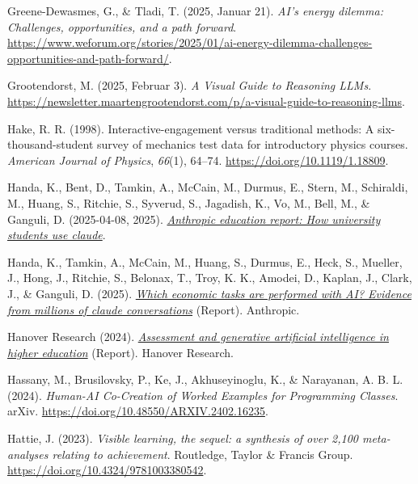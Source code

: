 \documentclass[
  ngerman,
  letterpaper,
  DIV=11]{scrreprt}
\newlength{\cslhangindent}
\newenvironment{CSLReferences}[2] %
 {\begin{list}{}{%
  \setlength{\itemindent}{0pt}
  \setlength{\leftmargin}{0pt}
  \setlength{\parsep}{0pt}
  \ifodd #1
   \setlength{\leftmargin}{\cslhangindent}
   \setlength{\itemindent}{-1\cslhangindent}
  \fi
  \setlength{\itemsep}{#2\baselineskip}}}
 {\end{list}}
\begin{document}
\begin{CSLReferences}{1}{0}
Greene-Dewasmes, G., \& Tladi, T. (2025, Januar 21). \emph{AI's energy
dilemma: Challenges, opportunities, and a path forward}.
\url{https://www.weforum.org/stories/2025/01/ai-energy-dilemma-challenges-opportunities-and-path-forward/}.

Grootendorst, M. (2025, Februar 3). \emph{A Visual Guide to Reasoning
LLMs}.
\url{https://newsletter.maartengrootendorst.com/p/a-visual-guide-to-reasoning-llms}.

Hake, R. R. (1998). Interactive-engagement versus traditional methods: A
six-thousand-student survey of mechanics test data for introductory
physics courses. \emph{American Journal of Physics}, \emph{66}(1),
64--74. \url{https://doi.org/10.1119/1.18809}.

Handa, K., Bent, D., Tamkin, A., McCain, M., Durmus, E., Stern, M.,
Schiraldi, M., Huang, S., Ritchie, S., Syverud, S., Jagadish, K., Vo,
M., Bell, M., \& Ganguli, D. (2025-04-08, 2025).
\emph{\href{https://www.anthropic.com/news/anthropic-education-report-how-university-students-use-claude}{Anthropic
education report: How university students use claude}}.

Handa, K., Tamkin, A., McCain, M., Huang, S., Durmus, E., Heck, S.,
Mueller, J., Hong, J., Ritchie, S., Belonax, T., Troy, K. K., Amodei,
D., Kaplan, J., Clark, J., \& Ganguli, D. (2025).
\emph{\href{https://assets.anthropic.com/m/2e23255f1e84ca97/original/Economic_Tasks_AI_Paper.pdf}{Which
economic tasks are performed with AI? Evidence from millions of claude
conversations}} (Report). Anthropic.

Hanover Research (2024).
\emph{\href{https://cms.ahs.uic.edu/inside-ahs/wp-content/uploads/sites/12/2024/04/Assessment-and-Generative-Artificial-Intelligence-in-Higher-Education.pdf}{Assessment
and generative artificial intelligence in higher education}} (Report).
Hanover Research.

Hassany, M., Brusilovsky, P., Ke, J., Akhuseyinoglu, K., \& Narayanan,
A. B. L. (2024). \emph{Human-AI Co-Creation of Worked Examples for
Programming Classes}. arXiv.
\url{https://doi.org/10.48550/ARXIV.2402.16235}.

Hattie, J. (2023). \emph{Visible learning, the sequel: a synthesis of
over 2,100 meta-analyses relating to achievement}. Routledge, Taylor \&
Francis Group. \url{https://doi.org/10.4324/9781003380542}.


\end{CSLReferences}
\end{document}

